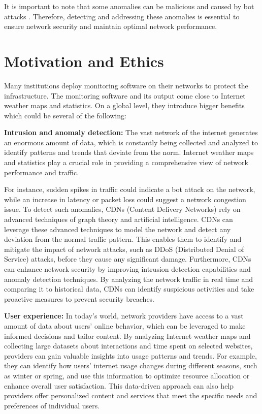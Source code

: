 \documentclass[sigconf,authorversion,nonacm]{acmart}
\begin{document}
It is important to note that some anomalies can be malicious and caused by bot attacks \cite{6524462}. Therefore, detecting and addressing these anomalies is essential to ensure network security and maintain optimal network performance.

\section{Motivation and Ethics}
Many institutions deploy monitoring software on their networks to protect the infrastructure. The monitoring software and its output come close to Internet weather maps and statistics. On a global level, they introduce bigger benefits which could be several of the following:

\textbf{Intrusion and anomaly detection:} The vast network of the internet generates an enormous amount of data, which is constantly being collected and analyzed to identify patterns and trends that deviate from the norm. Internet weather maps and statistics play a crucial role in providing a comprehensive view of network performance and traffic. 

For instance, sudden spikes in traffic could indicate a bot attack on the network, while an increase in latency or packet loss could suggest a network congestion issue. To detect such anomalies, CDNs (Content Delivery Networks) rely on advanced techniques of graph theory and artificial intelligence.  CDNs can leverage these advanced techniques to model the network and detect any deviation from the normal traffic pattern. This enables them to identify and mitigate the impact of network attacks, such as DDoS (Distributed Denial of Service) attacks, before they cause any significant damage. Furthermore, CDNs can enhance network security by improving intrusion detection capabilities and anomaly detection techniques. By analyzing the network traffic in real time and comparing it to historical data, CDNs can identify suspicious activities and take proactive measures to prevent security breaches. 

\textbf{User experience:} In today's world, network providers have access to a vast amount of data about users' online behavior, which can be leveraged to make informed decisions and tailor content. By analyzing Internet weather maps and collecting large datasets about interactions and time spent on selected websites, providers can gain valuable insights into usage patterns and trends. For example, they can identify how users' internet usage changes during different seasons, such as winter or spring, and use this information to optimize resource allocation or enhance overall user satisfaction. This data-driven approach can also help providers offer personalized content and services that meet the specific needs and preferences of individual users.
\end{document}
